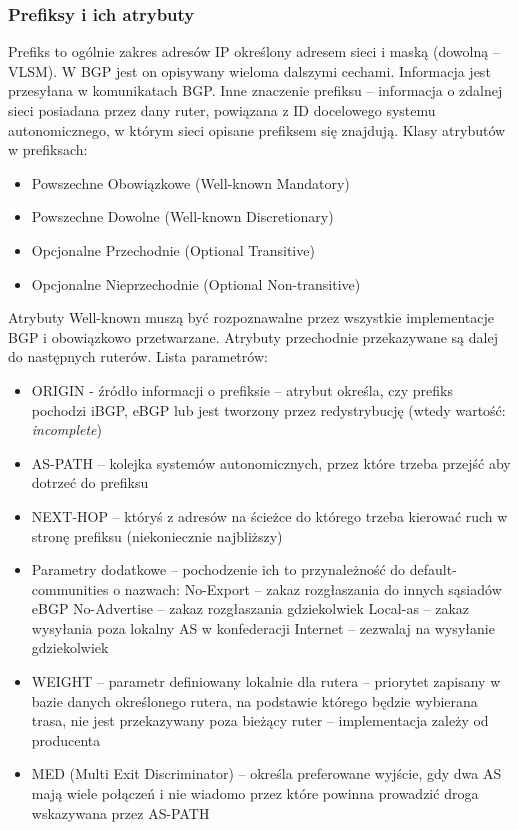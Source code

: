 \documentclass[a4paper, 12pt, titlepage]{article}
\begin{document}
			\subsubsection{Prefiksy i ich atrybuty}
				Prefiks to ogólnie zakres adresów IP określony adresem sieci i maską (dowolną -- VLSM). W BGP jest on opisywany wieloma dalszymi cechami. Informacja jest przesyłana w komunikatach BGP. Inne znaczenie prefiksu -- informacja o zdalnej sieci posiadana przez dany ruter, powiązana z ID docelowego systemu autonomicznego, w którym sieci opisane prefiksem się znajdują.
				\newline \newline
				Klasy atrybutów w prefiksach:
				\begin{itemize}
					\item Powszechne Obowiązkowe (Well-known Mandatory)
					\item Powszechne Dowolne (Well-known Discretionary)
					\item Opcjonalne Przechodnie (Optional Transitive)
					\item Opcjonalne Nieprzechodnie (Optional Non-transitive)
				\end{itemize}
				Atrybuty Well-known muszą być rozpoznawalne przez wszystkie implementacje BGP i obowiązkowo przetwarzane. Atrybuty przechodnie przekazywane są dalej do następnych ruterów.
				\newline \newline
				Lista parametrów:
				\begin{itemize}
					\item ORIGIN - źródło informacji o prefiksie -- atrybut określa, czy prefiks pochodzi iBGP, eBGP lub jest tworzony przez redystrybucję (wtedy wartość: \textit{incomplete})
					\item AS-PATH -- kolejka systemów autonomicznych, przez które trzeba przejść aby dotrzeć do prefiksu
					\item NEXT-HOP -- któryś z adresów na ścieżce do którego trzeba kierować ruch w stronę prefiksu (niekoniecznie najbliższy)
					\item Parametry dodatkowe -- pochodzenie ich to przynależność do default-communities o nazwach:
						\subitem No-Export -- zakaz rozgłaszania do innych sąsiadów eBGP
						\subitem No-Advertise -- zakaz rozgłaszania gdziekolwiek
						\subitem Local-as -- zakaz wysyłania poza lokalny AS w konfederacji 
						\subitem Internet -- zezwalaj na wysyłanie gdziekolwiek
					\item WEIGHT -- parametr definiowany lokalnie dla rutera -- priorytet zapisany w bazie danych określonego rutera, na podstawie którego będzie wybierana trasa, nie jest przekazywany poza bieżący ruter -- implementacja zależy od producenta
					\item MED (Multi Exit Discriminator) -- określa preferowane wyjście, gdy dwa AS mają wiele połączeń i nie wiadomo przez które powinna prowadzić droga wskazywana przez AS-PATH
				\end{itemize}
\end{document}

